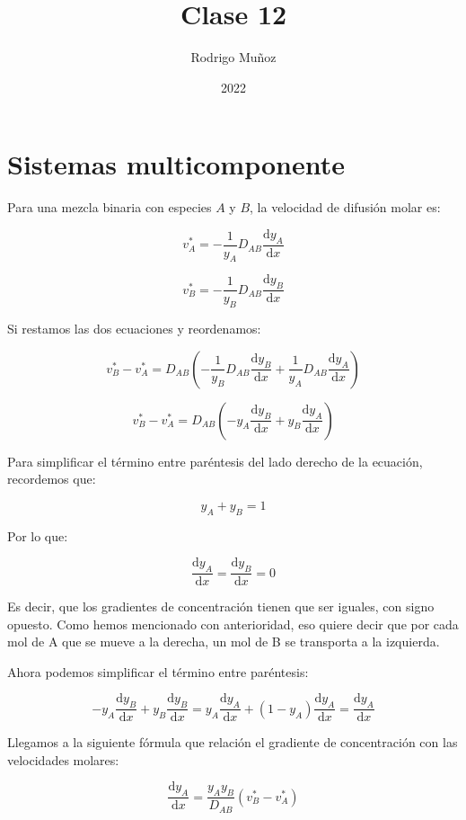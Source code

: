 \documentclass[11pt]{article}
\title{Clase 12}
\author{Rodrigo Muñoz}
\date{2022}
\begin{document}
\maketitle

\section{Sistemas multicomponente}

Para una mezcla binaria con especies \( A \) y \( B \), la velocidad de difusión molar es:

\[ v_{A}^{*} = - \frac{1}{y_A} D_{AB} \frac{ \mathrm d y_A }{ \mathrm d x } \]

\[ v_{B}^{*} = - \frac{1}{y_B} D_{AB} \frac{ \mathrm d y_B }{ \mathrm d x } \]

Si restamos las dos ecuaciones y reordenamos:

\[ v_{B}^{*} - v_{A}^{*} = D_{AB} \left( - \frac{1}{y_B} D_{AB} \frac{ \mathrm d y_B }{ \mathrm d x } + \frac{1}{y_A} D_{AB} \frac{ \mathrm d y_A }{ \mathrm d x } \right) \]

\[ v_{B}^{*} - v_{A}^{*} = D_{AB} \left( - y_A \frac{ \mathrm d y_B }{ \mathrm d x } + y_B \frac{ \mathrm d y_A }{ \mathrm d x } \right) \]

Para simplificar el término entre paréntesis del lado derecho de la ecuación, recordemos que:

\[ y_A + y_B = 1 \]

Por lo que:

\[ \frac{ \mathrm d y_A }{ \mathrm d x } = \frac{ \mathrm d y_B }{ \mathrm d x } = 0 \]

Es decir, que los gradientes de concentración tienen que ser iguales, con signo opuesto. Como hemos mencionado con anterioridad, eso quiere decir que por cada mol de A que se mueve a la derecha, un mol de B se transporta a la izquierda.

Ahora podemos simplificar el término entre paréntesis:

\[ - y_A \frac{ \mathrm d y_B }{ \mathrm d x } + y_B \frac{ \mathrm d y_B }{ \mathrm d x } = y_A \frac{ \mathrm d y_A }{ \mathrm d x } + \left( 1 - y_A \right) \frac{ \mathrm d y_A }{ \mathrm d x } = \frac{ \mathrm d y_A }{ \mathrm d x } \]

Llegamos a la siguiente fórmula que relación el gradiente de concentración con las velocidades molares:

\[ \boxed{ \frac{ \mathrm d y_A }{ \mathrm d x } = \frac{ y_A y_B }{ D_{AB} } \left( v_{B}^{*} - v_{A}^{*} \right) } \]
\end{document}
